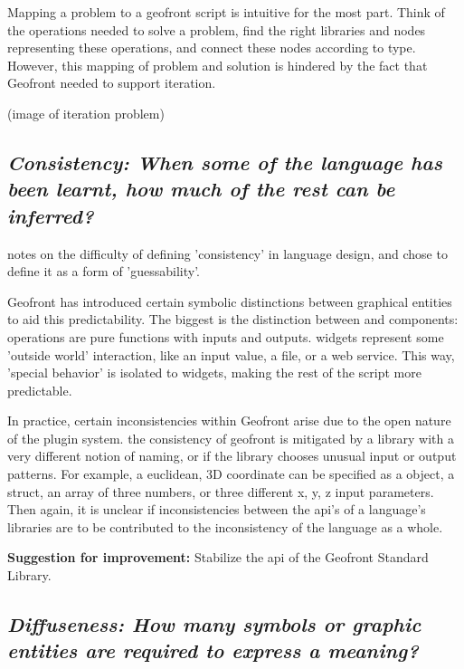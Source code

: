 Mapping a problem to a geofront script is intuitive for the most part.
Think of the operations needed to solve a problem, 
find the right libraries and nodes representing these operations,
and connect these nodes according to type. 
However, this mapping of problem and solution is hindered by the fact that Geofront needed to support iteration. 

(image of iteration problem)



\subsection*{\emph{Consistency: When some of the language has been learnt, how much of the rest can be inferred? }}

\cite[]{green_usability_1996} notes on the difficulty of defining 'consistency' in language design, and chose to define it as a form of 'guessability'.

Geofront has introduced certain symbolic distinctions between graphical entities to aid this predictability. 
The biggest is the distinction between  and  components: 
operations are pure functions with inputs and outputs. 
widgets represent some 'outside world' interaction, like an input value, a file, or a web service. 
This way, 'special behavior' is isolated to widgets, making the rest of the script more predictable. 

In practice, certain inconsistencies within Geofront arise due to the open nature of the plugin system. 
the consistency of geofront is mitigated by a library with a very different notion of naming, or if the library chooses unusual input or output patterns. 
For example, a euclidean, 3D coordinate can be specified as a  object, a struct, an array of three numbers, or three different x, y, z input parameters.
Then again, it is unclear if inconsistencies between the api's of a language's libraries are to be contributed to the inconsistency of the language as a whole. 

\textbf{Suggestion for improvement:} Stabilize the api of the Geofront Standard Library.



\subsection*{\emph{Diffuseness: How many symbols or graphic entities are required to express a meaning? }}

